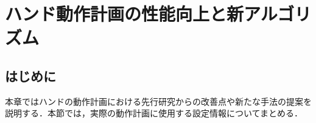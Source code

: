 \documentclass[a4paper,twoside,12pt,papersize, dvipdfmx]{iirthesis}
\begin{document}
    \newcommand{\figref}[1]{\figurename\ref{#1}}
    \newcommand{\tabref}[1]{\tablename\ref{#1}}
    \renewcommand{\eqref}[1]{式~(\ref{#1})}
    \newcommand{\chapref}[1]{\ref{#1}章}
    \newcommand{\secref}[1]{\ref{#1}節}
    \newcommand{\ssecref}[1]{\ref{#1}項}
    \newcommand{\appref}[1]{付録\ref{#1}}
    \newcommand{\algoref}[1]{Algorithm.\ref{#1}}
\fi

\newcommand{\tab}[0]{\;\;\;\;}

\chapter{ハンド動作計画の性能向上と新アルゴリズム}\label{chap::planner}
\minitoc

\section{はじめに}\label{sec::planner::intro}
本章ではハンドの動作計画における先行研究からの改善点や新たな手法の提案を説明する．本節では，実際の動作計画に使用する設定情報についてまとめる．\par
\end{document}
